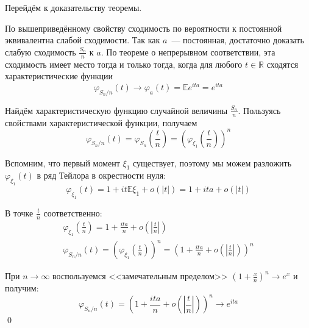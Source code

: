 \documentclass[oneside,final,14pt]{extreport}
\renewenvironment{proof}{{\bfseries Доказательство.}}{\qed}
\theoremstyle{plain}
\theoremstyle{definition}
\theoremstyle{named}
\begin{document}
Перейдём к доказательству теоремы.

\begin{proof}
    По вышеприведённому свойству сходимость по вероятности к постоянной эквивалентна слабой сходимости. Так как $a$~--- постоянная, достаточно доказать слабую сходимость $\frac{S_{n}}{n}$ к $a$. По теореме о непрерывном соответствии, эта сходимость имеет место тогда и только тогда, когда для любого $t \in \mathbb{R}$ сходятся характеристические функции
    \begin{equation*}
        \varphi_{S_{n} / n}(t) \rightarrow \varphi_{a}(t)=\mathbb{E} e^{i t a}=e^{i t a}
    \end{equation*}
    
    Найдём характеристическую функцию случайной величины $\frac{S_{n}}{n}$. Пользуясь свойствами характеристической функции, получаем
    \begin{equation*}
        \varphi_{S_{n} / n}(t)=\varphi_{S_{n}}\left(\frac{t}{n}\right)=\left(\varphi_{\xi_{1}}\left(\frac{t}{n}\right)\right)^{n}
    \end{equation*}
    
    Вспомним, что первый момент $\xi_{1}$ существует, поэтому мы можем разложить $\varphi_{\xi_{1}}(t)$ в ряд Тейлора в окрестности нуля:
    \begin{equation*}
        \varphi_{\xi_{1}}(t)=1+i t \mathbb{E} \xi_{1}+o(|t|)=1+i t a+o(|t|)
    \end{equation*}
    
    В точке $\frac{t}{n}$ соответственно:
    \begin{gather*}
        \varphi_{\xi_{1}}\left(\frac{t}{n}\right)=1+\frac{i t a}{n}+o\left(\left|\frac{t}{n}\right|\right) \\
        \varphi_{S_{n} / n}(t)=\left(\varphi_{\xi_{1}}\left(\frac{t}{n}\right)\right)^{n}=\left(1+\frac{i t a}{n}+o\left(\left|\frac{t}{n}\right|\right)\right)^{n}
    \end{gather*}
    
    При $n \rightarrow \infty$ воспользуемся <<замечательным пределом>> $\left(1+\frac{x}{n}\right)^{n} \rightarrow e^{x}$ и получим:
    \begin{equation*}
        \varphi_{S_{n} / n}(t)=\left(1+\frac{i t a}{n}+o\left(\left|\frac{t}{n}\right|\right)\right)^{n} \rightarrow e^{i t a}
    \end{equation*}
\end{proof}
\end{document}
